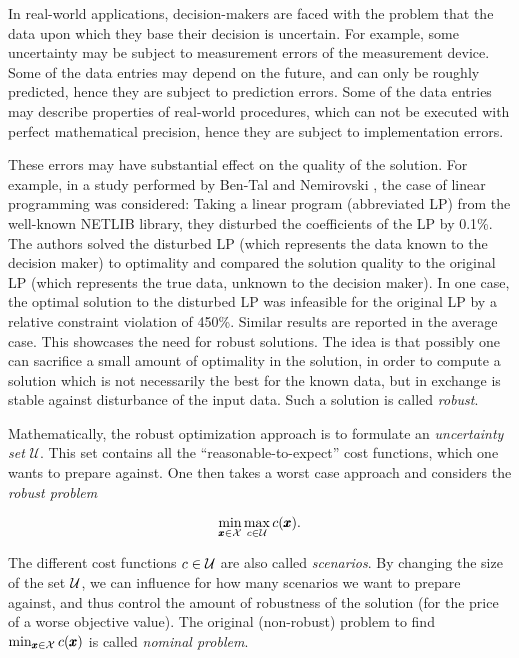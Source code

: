 In real-world applications, decision-makers are faced with the problem that the data upon which they base their decision is uncertain. For example, some uncertainty may be subject to measurement errors of the measurement device. Some of the data entries may depend on the future, and can only be roughly predicted, hence they are subject to prediction errors. Some of the data entries may describe properties of real-world procedures, which can not be executed with perfect mathematical precision, hence they are subject to implementation errors.

These errors may have substantial effect on the quality of the solution. For example, in a study performed by Ben-Tal and Nemirovski \cite{ben2000robust}, the case of linear programming was considered: 
Taking a linear program (abbreviated LP) from the well-known NETLIB library, they disturbed the coefficients of the LP by 0.1\%. 
The authors solved the disturbed LP (which represents the data known to the decision maker) to optimality and compared the solution quality to the original LP (which represents the true data, unknown to the decision maker). 
In one case, the optimal solution to the disturbed LP was infeasible for the original LP by a relative constraint violation of 450\%. 
Similar results are reported in the average case. This showcases the need for robust solutions. The idea is that possibly one can sacrifice a small amount of optimality in the solution, in order to compute a solution which is not necessarily the best for the known data, but in exchange is stable against disturbance of the input data. Such a solution is called \emph{robust}.



Mathematically, the robust optimization approach is to formulate an \textit{uncertainty set} $\mathcal{U}$. This set contains all the \enquote{reasonable-to-expect} cost functions, which one wants to prepare against. One then takes a worst case approach and considers the \emph{robust problem}

\[
	\min_{\pmb x \in \mathcal{X}} \max_{c \in \mathcal{U}} c(\pmb x).
\]

The different cost functions $c \in \mathcal{U}$ are also called \emph{scenarios}. By changing the size of the set $\mathcal{U}$, we can influence for how many scenarios we want to prepare against, and thus control the amount of robustness of the solution (for the price of a worse objective value). The original (non-robust) problem to find $\min_{\pmb x \in \mathcal{X}} c(\pmb x)$ is called \emph{nominal problem}.

